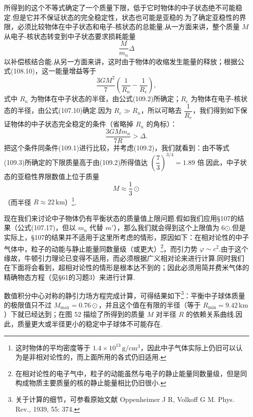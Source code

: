 所得到的这个不等式确定了一个质量下限，低于它时物体的中子状态绝不可能稳定.但是它并不保证状态的完全稳定性，状态也可能是亚稳的.为了确定亚稳性的界限，必须比较物体在中子状态和电子-核状态的总能量.从一方面来讲，整个质量 $M$ 从电子-核状态转变到中子状态要求损耗能量
\begin{equation*}
  \frac{M}{m_n}\Delta
\end{equation*}
以补偿核结合能.从另一方面来讲，这时由于物体的收缩发生能量的释放；根据公式(108.10)，这一能量增益等于
\begin{equation*}
  \frac{3GM^2}{7}\left(\frac{1}{R_n}-\frac{1}{R_e}\right),
\end{equation*}
式中 $R_n$ 为物体在中子状态的半径，由公式(109.2)所确定；$R_e$ 为物体在电子-核状态的半径，由公式(107.10)确定.因为 $R_e\gg R_n$，所以可略去 $\dfrac{1}{R_e}$，我们得到如下保证物体的中子状态完全稳定的条件（省略掉 $R_n$ 的角标）：
\begin{equation}
  \frac{3GMm_n}{7R}>\Delta.
\end{equation}
把这个条件同条件(109.1)进行比较，并考虑(109.2)，我们就看到：由不等式(109.3)所确定的下限质量高于由(109.2)所得值达 $\left(\dfrac73\right)^{3/4}=1.89$ 倍.因此，中子状态的亚稳性界限数值上位于质量
\begin{equation*}
  M\approx\frac13\odot
\end{equation*}
（而半径 $R\approx22\,\mathrm{km}$）\footnote{这时物体的平均密度等于 $1.4\times10^{13}\,\mathrm{g/cm^{3}}$，因此中子气体实际上仍旧可以认为是非相对论性的，而上面所用的各式仍旧适用.}.

现在我们来讨论中子物体仍有平衡状态的质量值上限问题.假如我们应用§107的结果（公式(107.17)，但以 $m_n$ 代替 $m'$），那么我们就会得到这个上限值为 6$\odot$.但是实际上，§107的结果并不适用于这里所考虑的情形，原因如下：在相对论性的中子气体中，粒子的动能与静止能量同数量级（或更大）\footnote{在相对论性的电子气中，粒子的动能虽然与电子的静止能量同数量级，但是同构成物质主要质量的核的静止能量相比仍旧很小.}，而引力势 $\varphi\sim c^2$.由于这个缘故，牛顿引力理论已变得不适用，而必须根据广义相对论来进行计算.同时我们在下面将会看到，超相对论性的情形是根本达不到的；因此必须用简并费米气体的精确物态方程（见§61的习题3）来进行计算.

数值积分中心对称的静引力场方程完成计算，可得结果如下\footnote{关于计算的细节，可参看原始文献 Oppenheimer J R, Volkoff G M. Phys. Rev., 1939, 55: 374.}：平衡中子球体质量的极限值只不过 $M_{\mathrm{max}}=0.76\odot$，并且这个值在有限的半径（等于 $R_{\mathrm{min}}=9.42\,\mathrm{km}$）下就已经达到；在图 52 描绘了所得到的质量 $M$ 对半径 $R$ 的依赖关系曲线.因此，质量更大或半径更小的稳定中子球体不可能存在.

